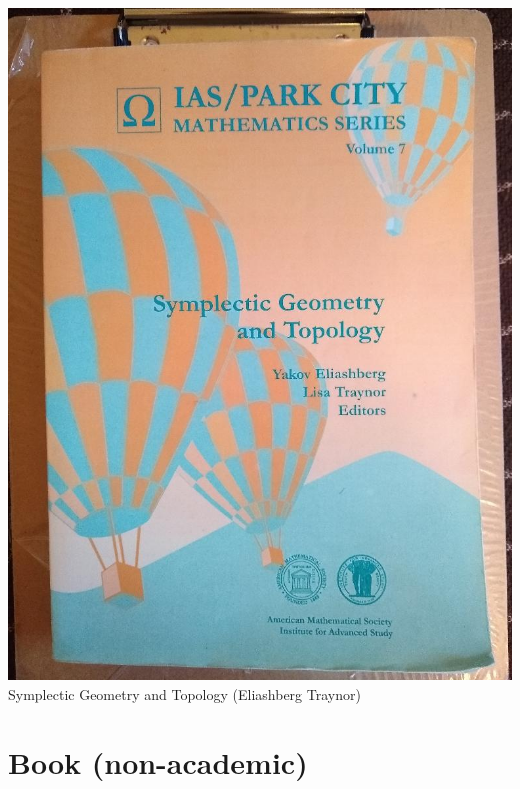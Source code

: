 \documentclass[t]{beamer}
\newcommand{\htarget}[2]{\hypertarget{#1}{#2}}
\begin{document}
\begin{frame}\htarget{SET}{} \begin{center}
\includegraphics[height=0.8\textheight]{Symplectic_Geometry_and_Topology_Eliashberg_mini.jpg} \\
Symplectic Geometry and Topology (Eliashberg Traynor) 
\end{center} \end{frame}
\section{Book (non-academic)}
\end{document}
